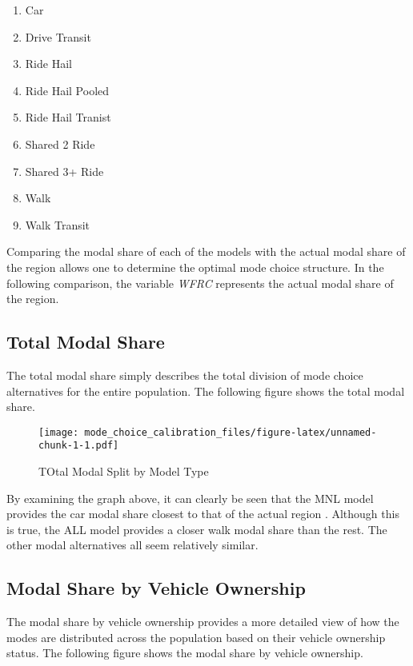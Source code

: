\documentclass[3p, authoryear]{elsarticle} %
\providecommand{\tightlist}{%
  \setlength{\itemsep}{0pt}\setlength{\parskip}{0pt}}
\begin{document}
\begin{enumerate}
\def\labelenumi{\arabic{enumi}.}
\tightlist
\item
  Car
\item
  Drive Transit
\item
  Ride Hail
\item
  Ride Hail Pooled
\item
  Ride Hail Tranist
\item
  Shared 2 Ride
\item
  Shared 3+ Ride
\item
  Walk
\item
  Walk Transit
\end{enumerate}

Comparing the modal share of each of the models with the actual modal share of the region allows one to determine the optimal mode choice structure. In the following comparison, the variable \emph{WFRC} represents the actual modal share of the region.

\hypertarget{total-modal-share}{%
\subsection{Total Modal Share}\label{total-modal-share}}

The total modal share simply describes the total division of mode choice alternatives for the entire population. The following figure shows the total modal share.

\begin{figure}
\centering
\texttt{[image: mode\_choice\_calibration\_files/figure-latex/unnamed-chunk-1-1.pdf]}
\caption{\label{fig:unnamed-chunk-1}TOtal Modal Split by Model Type}
\end{figure}

By examining the graph above, it can clearly be seen that the MNL model provides the car modal share closest to that of the actual region . Although this is true, the ALL model provides a closer walk modal share than the rest. The other modal alternatives all seem relatively similar.

\hypertarget{modal-share-by-vehicle-ownership}{%
\subsection{Modal Share by Vehicle Ownership}\label{modal-share-by-vehicle-ownership}}

The modal share by vehicle ownership provides a more detailed view of how the modes are distributed across the population based on their vehicle ownership status. The following figure shows the modal share by vehicle ownership.
\end{document}

